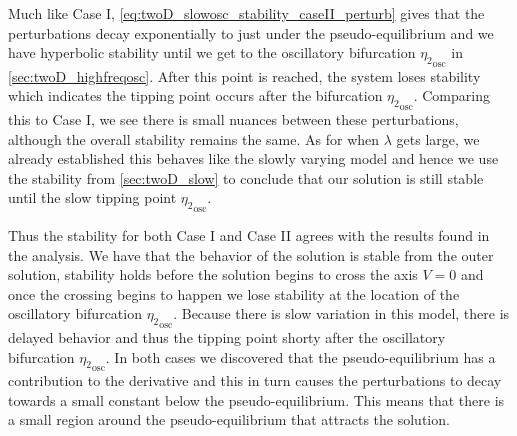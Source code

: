 Much like Case I, \eqref{eq:twoD_slowosc_stability_caseII_perturb} gives that the perturbations decay exponentially to just under the pseudo-equilibrium and we have hyperbolic stability until we get to the oscillatory bifurcation ${\eta_2}_{\text{osc}}$ in \autoref{sec:twoD_highfreqosc}. After this point is reached, the system loses stability which indicates the tipping point occurs after the bifurcation ${\eta_2}_{\text{osc}}$. Comparing this to Case I, we see there is small nuances between these perturbations, although the overall stability remains the same. As for when $\lambda$ gets large, we already established this behaves like the slowly varying model and hence we use the stability from \autoref{sec:twoD_slow} to conclude that our solution is still stable until the slow tipping point ${\eta_2}_{\text{osc}}$.


Thus the stability for both Case I and Case II agrees with the results found in the analysis. We have that the behavior of the solution is stable from the outer solution, stability holds before the solution begins to cross the axis $V=0$ and once the crossing begins to happen we lose stability at the location of the oscillatory bifurcation ${\eta_2}_{\text{osc}}$. Because there is slow variation in this model, there is delayed behavior and thus the tipping point shorty after the oscillatory bifurcation ${\eta_2}_{\text{osc}}$. In both cases we discovered that the pseudo-equilibrium has a contribution to the derivative and this in turn causes the perturbations to decay towards a small constant below the pseudo-equilibrium. This means that there is a small region around the pseudo-equilibrium that attracts the solution.
